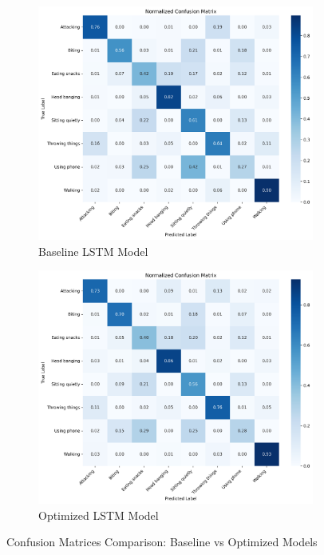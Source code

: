 \documentclass{iopconfser}
\begin{document}
\begin{figure}[H]
\centering
\begin{subfigure}{0.48\textwidth}
    \centering
    \includegraphics[width=\textwidth]{results/metrics/baseline/confusion_matrix.png}
    \caption{Baseline LSTM Model}
    \label{fig:baseline_confusion}
\end{subfigure}
\hfill
\begin{subfigure}{0.48\textwidth}
    \centering
    \includegraphics[width=\textwidth]{results/metrics/optimized/confusion_matrix.png}
    \caption{Optimized LSTM Model}
    \label{fig:optimized_confusion}
\end{subfigure}
\caption{Confusion Matrices Comparison: Baseline vs Optimized Models}
\label{fig:confusion_matrices}
\end{figure}
\end{document}
